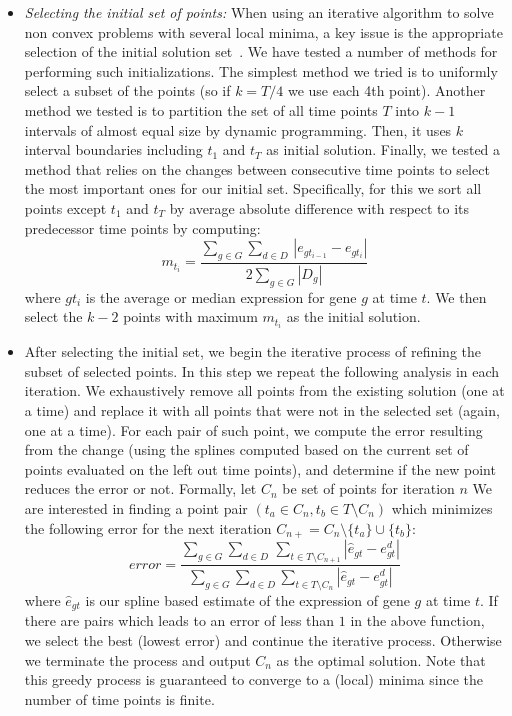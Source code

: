 \documentclass[10pt]{article}
\begin{document}
\begin{itemize}
\item {\em Selecting the initial set of points:} When using an iterative algorithm to solve non convex problems with several local minima,
a key issue is the appropriate selection of the initial solution
set~\cite{kmeans, mixture}. We have tested a number
of methods for performing such initializations. The simplest method
we tried is to uniformly select a subset of the points (so if
$k=T/4$ we use each 4th point). Another method we tested is to partition the set
of all time points $T$ into $k-1$ intervals of almost equal size by
dynamic programming. Then, it uses $k$ interval boundaries including
$t_{1}$ and $t_{T}$ as initial solution. Finally, we tested a
method that relies on the changes between consecutive time points to
select the most important ones for our initial set. Specifically,
for this we sort all points except $t_{1}$ and $t_{T}$ by average
absolute difference with respect to its predecessor time points by
computing:
%
\begin{equation}
m_{t_{i}} = \frac{\sum_{g \in G} \sum_{d \in D}\,|e_{g t_{i-1}} -
e_{g t_{i}}|}{2 \sum_{g \in G} |D_{g}|}
\end{equation}
where $g t_{i}$ is the average or median expression for gene $g$ at
time $t$. We then select the $k-2$ points with maximum $m_{t_{i}}$
as the initial solution.

\item After selecting the initial set, we begin the iterative process of refining the subset of selected points.
In this step we repeat the following analysis in each iteration. We
exhaustively remove all points from the existing solution (one at a
time) and replace it with all points that were not in the selected
set (again, one at a time). For each pair of such point, we compute
the error resulting from the change (using the splines computed
based on the current set of points evaluated on the left out time
points), and determine if the new point reduces the error or not.
Formally, let $C_n$ be set of points for iteration $n$ We are
interested in finding a point pair $(t_{a} \in C_n, t_{b} \in T
\setminus C_n)$
which minimizes the following error for the next iteration $C_{n+} =
C_n \setminus \{t_{a}\} \cup \{t_{b}\}$:
%
\begin{equation}
\textit{error} = \frac{\sum_{g \in G} \sum_{d \in D}\, \sum_{t \in
    T \setminus C_{n+1}}|\hat{e}_{gt} - e_{gt}^{d}|}{\sum_{g \in G}
  \sum_{d \in D} \sum_{t \in
    T \setminus C_{n}} |\hat{e}_{gt} - e_{gt}^{d}|}
\end{equation}
%
where $\hat{e}_{gt}$ is our spline based estimate of the expression
of gene $g$ at time $t$. If there are pairs which leads to an error
of less than $1$ in the above function, we select the best (lowest
error) and continue the iterative process. Otherwise we terminate
the process and output $C_n$ as the optimal solution. Note that this
greedy process is guaranteed to converge to a (local) minima since
the number of time points is finite.


\end{itemize}
\end{document}
